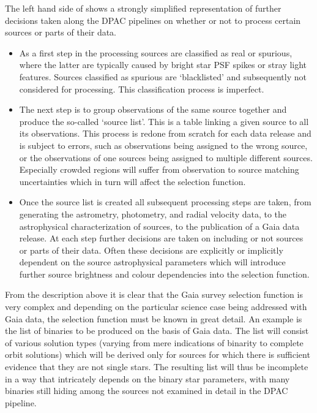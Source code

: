 The left hand side of  shows a strongly simplified representation of further decisions taken along the DPAC pipelines on whether or not to process certain sources or parts of their data.
\begin{itemize}
    \item As a first step in the processing sources are classified as real or spurious, where the latter are typically caused by bright star PSF spikes or stray light features. Sources classified as spurious are `blacklisted' and subsequently not considered for processing. This classification process is imperfect.
    \item The next step is to group observations of the same source together and produce the so-called `source list'. This is a table linking a given source to all its observations. This process is redone from scratch for each data release and is subject to errors, such as observations being assigned to the wrong source, or the observations of one sources being assigned to multiple different sources. Especially crowded regions will suffer from observation to source matching uncertainties which in turn will affect the selection function.
    \item Once the source list is created all subsequent processing steps are taken, from generating the astrometry, photometry, and radial velocity data, to the astrophysical characterization of sources, to the publication of a Gaia data release. At each step further decisions are taken on including or not sources or parts of their data. Often these decisions are explicitly or implicitly dependent on the source astrophysical parameters which will introduce further source brightness and colour dependencies into the selection function.
\end{itemize}

From the description above it is clear that the Gaia survey selection function is very complex and depending on the particular science case being addressed with Gaia data, the selection function must be known in great detail. An example is the list of binaries to be produced on the basis of Gaia data. The list will consist of various solution types (varying from mere indications of binarity to complete orbit solutions) which will be derived only for sources for which there is sufficient evidence that they are not single stars. The resulting list will thus be incomplete in a way that intricately depends on the binary star parameters, with many binaries still hiding among the sources not examined in detail in the DPAC pipeline.


